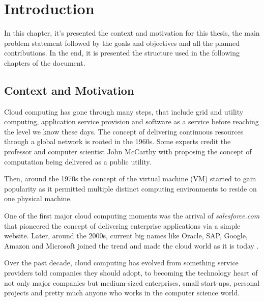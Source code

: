 \newcommand{\novathesis}{\emph{novathesis}}
\newcommand{\novathesisclass}{\texttt{novathesis.cls}}


\chapter{Introduction}
\label{cha:introduction}

In this chapter, it's presented the context and motivation for this thesis, the main problem statement followed by the goals and objectives and all the planned contributions. In the end, it is presented the structure used in the following chapters of the document.

\section{Context and Motivation} %
\label{sec:context_and_motivation}

Cloud computing has gone through many steps, that include grid and utility computing, application service provision and software as a service before reaching the level we know these days. The concept of delivering continuous resources through a global network is rooted in the 1960s. Some experts credit the professor and computer scientist John McCarthy \cite{john_mcCarthy:1} with proposing the concept of computation being delivered as a public utility.

Then, around the 1970s the concept of the virtual machine (\gls{VM}) started to gain popularity as it permitted multiple distinct computing environments to reside on one physical machine.

One of the first major cloud computing moments was the arrival of \textit{salesforce.com} that pioneered the concept of delivering enterprise applications via a simple website. Later, around the 2000s, current big names like Oracle, SAP, Google, Amazon and Microsoft joined the trend and made the cloud world as it is today \cite{cloud_history:1, cloud_history:2}.

Over the past decade, cloud computing has evolved from something service providers told companies they should adopt, to becoming the technology heart of not only major companies but medium-sized enterprises, small start-ups, personal projects and pretty much anyone who works in the computer science world. 

